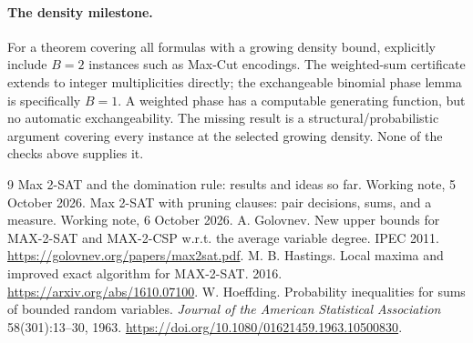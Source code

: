 \documentclass[11pt,a4paper]{article}
\theoremstyle{remark}
\begin{document}
\paragraph{The density milestone.}
For a theorem covering all formulas with a growing density bound, explicitly
include $B=2$ instances such as Max-Cut encodings. The weighted-sum certificate
extends to integer multiplicities directly; the exchangeable binomial phase
lemma is specifically $B=1$. A weighted phase has a computable generating
function, but no automatic exchangeability. The missing result is a
structural/probabilistic argument covering every instance at the selected
growing density. None of the checks above supplies it.

\begin{thebibliography}{9}
 Max 2-SAT and the domination rule: results and ideas so far.
Working note, 5 October 2026.
 Max 2-SAT with pruning clauses: pair decisions, sums, and a
measure. Working note, 6 October 2026.
 A. Golovnev. New upper bounds for MAX-2-SAT and MAX-2-CSP
w.r.t. the average variable degree. IPEC 2011.
\url{https://golovnev.org/papers/max2sat.pdf}.
 M. B. Hastings. Local maxima and improved exact algorithm
for MAX-2-SAT. 2016. \url{https://arxiv.org/abs/1610.07100}.
 W. Hoeffding. Probability inequalities for sums of bounded
random variables. \emph{Journal of the American Statistical Association}
58(301):13--30, 1963. \url{https://doi.org/10.1080/01621459.1963.10500830}.
\end{thebibliography}
\end{document}
